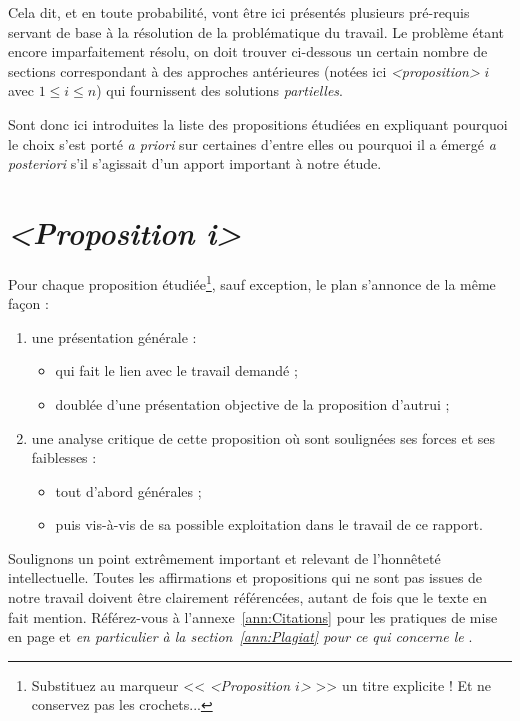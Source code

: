 \documentclass[11pt, french]{report-rd-info}
\begin{document}
Cela dit, et en toute probabilité, vont être ici présentés plusieurs pré-requis servant de base à la résolution de la problématique du travail. Le problème étant encore imparfaitement résolu, on doit trouver ci-dessous un certain nombre de sections correspondant à des approches antérieures (notées ici \emph{<proposition>} $i$ avec $1 \leq i \leq n$) qui fournissent des solutions \emph{partielles}.

Sont donc ici introduites la liste des propositions étudiées en expliquant pourquoi le choix s'est porté \emph{a priori} sur certaines d'entre elles ou pourquoi il a émergé \emph{a posteriori} s'il s'agissait d'un apport important à notre étude.

\section{\emph{<Proposition \textit{i}>}}

Pour chaque proposition étudiée\footnote{Substituez au marqueur << \emph{<Proposition $i$>} >> un titre explicite ! Et ne conservez pas les crochets...}, sauf exception, le plan s'annonce de la même façon :
\begin{enumerate}
	\item une présentation générale :
		\begin{itemize}
			\item qui fait le lien avec le travail demandé ;
			\item doublée d'une présentation objective de la proposition d'autrui ;
		\end{itemize}
	\item une analyse critique de cette proposition où sont soulignées ses forces et ses faiblesses :
		\begin{itemize}
			\item tout d'abord générales ;
			\item puis vis-à-vis de sa possible exploitation dans le travail de ce rapport.
		\end{itemize}
\end{enumerate}

Soulignons un point extrêmement important et relevant de l'honnêteté intellectuelle. Toutes les affirmations et propositions qui ne sont pas issues de notre travail doivent être clairement référencées, autant de fois que le texte en fait mention. Référez-vous à l'annexe~\ref{ann:Citations} pour les pratiques de mise en page et \emph{en particulier à la section~\ref{ann:Plagiat} pour ce qui concerne le }.
\end{document}
